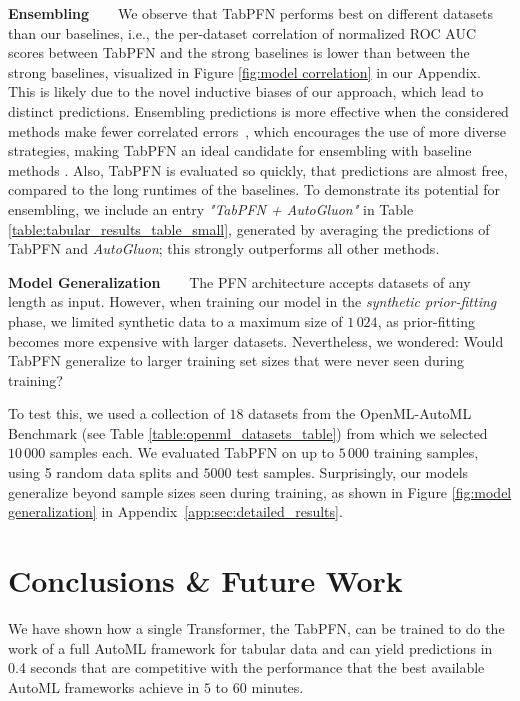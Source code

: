 \textbf{Ensembling~~~} We observe that TabPFN performs best on different datasets than our baselines, i.e., the per-dataset correlation of normalized ROC AUC scores between TabPFN and the strong baselines is lower than between the strong baselines, visualized in Figure \ref{fig:model correlation} in our Appendix. This is likely due to the novel inductive biases of our approach, which lead to distinct predictions. Ensembling predictions is more effective when the considered methods make fewer correlated errors~\citep{breimann-mlj01a}, which encourages the use of more diverse strategies, making TabPFN an ideal candidate for ensembling with baseline methods \citep{ensemblediversity}. Also, TabPFN is evaluated so quickly, that predictions are almost free, compared to the long runtimes of the baselines. To demonstrate its potential for ensembling, we include an entry \textit{"TabPFN + AutoGluon"} in Table \ref{table:tabular_results_table_small}, generated by averaging the predictions of TabPFN and \textit{AutoGluon}; this strongly outperforms all other methods.

\textbf{Model Generalization~~~} The PFN architecture accepts datasets of any length as input. However, when training our model in the \textit{synthetic prior-fitting} phase, we limited synthetic data to a maximum size of $1\,024$, as prior-fitting becomes more expensive with larger datasets. Nevertheless, we wondered: Would TabPFN generalize to larger training set sizes that were never seen during training?

To test this, we used a collection of $18$ datasets from the OpenML-AutoML Benchmark (see Table \ref{table:openml_datasets_table}) from which we selected $10\,000$ samples each. We evaluated TabPFN on up to $5\,000$ training samples, using 5 random data splits and $5000$ test samples. Surprisingly, our models generalize beyond sample sizes seen during training, as shown in Figure \ref{fig:model generalization} in Appendix~\ref{app:sec:detailed_results}.

\section{Conclusions \& Future Work}

We have shown how a single Transformer, the TabPFN, can be trained to do the work of a full AutoML framework for tabular data and can yield predictions in 0.4 seconds that are competitive with the performance that the best available AutoML frameworks achieve in $5$ to $60$ minutes.

